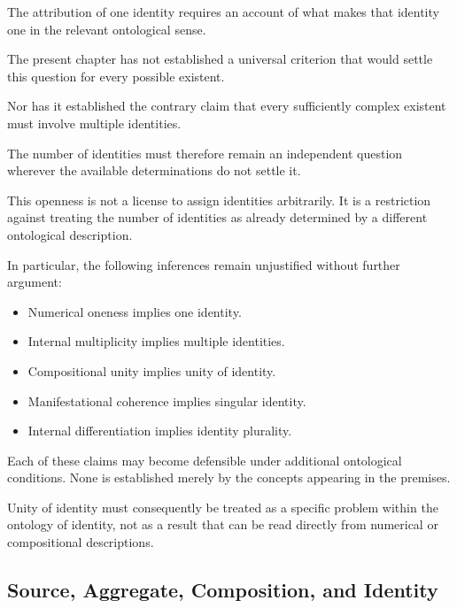 The attribution of one identity
requires an account of what makes
that identity one in the relevant
ontological sense.

The present chapter has not
established a universal criterion
that would settle this question
for every possible existent.

Nor has it established the contrary
claim that every sufficiently
complex existent must involve
multiple identities.

The number of identities must
therefore remain an independent
question wherever the available
determinations do not settle it.

This openness is not a license
to assign identities arbitrarily.
It is a restriction against treating
the number of identities as already
determined by a different ontological
description.

In particular, the following
inferences remain unjustified
without further argument:

\begin{itemize}
    \item Numerical oneness
    implies one identity.

    \item Internal multiplicity
    implies multiple identities.

    \item Compositional unity
    implies unity of identity.

    \item Manifestational coherence
    implies singular identity.

    \item Internal differentiation
    implies identity plurality.
\end{itemize}

Each of these claims may become
defensible under additional
ontological conditions.
None is established merely by
the concepts appearing in the
premises.

Unity of identity must consequently
be treated as a specific problem
within the ontology of identity,
not as a result that can be read
directly from numerical or
compositional descriptions.

\subsection{Source, Aggregate, Composition, and Identity}

